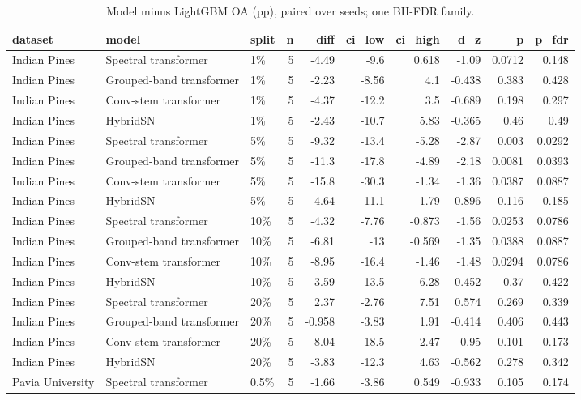 \begin{table}
\caption{Model minus LightGBM OA (pp), paired over seeds; one BH-FDR family.}
\label{tab:stats_scenes_vs_lightgbm}
\begin{tabular}{lllrrrrrrr}
\toprule
dataset & model & split & n & diff & ci\_low & ci\_high & d\_z & p & p\_fdr \\
\midrule
Indian Pines & Spectral transformer & 1\% & 5 & -4.49 & -9.6 & 0.618 & -1.09 & 0.0712 & 0.148 \\
Indian Pines & Grouped-band transformer & 1\% & 5 & -2.23 & -8.56 & 4.1 & -0.438 & 0.383 & 0.428 \\
Indian Pines & Conv-stem transformer & 1\% & 5 & -4.37 & -12.2 & 3.5 & -0.689 & 0.198 & 0.297 \\
Indian Pines & HybridSN & 1\% & 5 & -2.43 & -10.7 & 5.83 & -0.365 & 0.46 & 0.49 \\
Indian Pines & Spectral transformer & 5\% & 5 & -9.32 & -13.4 & -5.28 & -2.87 & 0.003 & 0.0292 \\
Indian Pines & Grouped-band transformer & 5\% & 5 & -11.3 & -17.8 & -4.89 & -2.18 & 0.0081 & 0.0393 \\
Indian Pines & Conv-stem transformer & 5\% & 5 & -15.8 & -30.3 & -1.34 & -1.36 & 0.0387 & 0.0887 \\
Indian Pines & HybridSN & 5\% & 5 & -4.64 & -11.1 & 1.79 & -0.896 & 0.116 & 0.185 \\
Indian Pines & Spectral transformer & 10\% & 5 & -4.32 & -7.76 & -0.873 & -1.56 & 0.0253 & 0.0786 \\
Indian Pines & Grouped-band transformer & 10\% & 5 & -6.81 & -13 & -0.569 & -1.35 & 0.0388 & 0.0887 \\
Indian Pines & Conv-stem transformer & 10\% & 5 & -8.95 & -16.4 & -1.46 & -1.48 & 0.0294 & 0.0786 \\
Indian Pines & HybridSN & 10\% & 5 & -3.59 & -13.5 & 6.28 & -0.452 & 0.37 & 0.422 \\
Indian Pines & Spectral transformer & 20\% & 5 & 2.37 & -2.76 & 7.51 & 0.574 & 0.269 & 0.339 \\
Indian Pines & Grouped-band transformer & 20\% & 5 & -0.958 & -3.83 & 1.91 & -0.414 & 0.406 & 0.443 \\
Indian Pines & Conv-stem transformer & 20\% & 5 & -8.04 & -18.5 & 2.47 & -0.95 & 0.101 & 0.173 \\
Indian Pines & HybridSN & 20\% & 5 & -3.83 & -12.3 & 4.63 & -0.562 & 0.278 & 0.342 \\
Pavia University & Spectral transformer & 0.5\% & 5 & -1.66 & -3.86 & 0.549 & -0.933 & 0.105 & 0.174 \\

\end{tabular}
\end{table}
